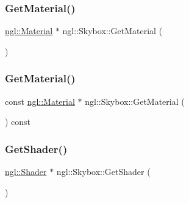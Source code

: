 \subsubsection{\texorpdfstring{Get\+Material()}{GetMaterial()}\hspace{0.1cm}{\footnotesize\ttfamily [1/2]}}
{\footnotesize\ttfamily \mbox{\hyperlink{classngl_1_1_material}{ngl\+::\+Material}} $\ast$ ngl\+::\+Skybox\+::\+Get\+Material (\begin{DoxyParamCaption}{ }\end{DoxyParamCaption})}

\mbox{\label{classngl_1_1_skybox_a04e9b704258a1527e41c3adfcc0d9f1d}} 
\subsubsection{\texorpdfstring{Get\+Material()}{GetMaterial()}\hspace{0.1cm}{\footnotesize\ttfamily [2/2]}}
{\footnotesize\ttfamily const \mbox{\hyperlink{classngl_1_1_material}{ngl\+::\+Material}} $\ast$ ngl\+::\+Skybox\+::\+Get\+Material (\begin{DoxyParamCaption}{ }\end{DoxyParamCaption}) const}

\mbox{\label{classngl_1_1_skybox_a3527ff0726586b9eec122f696ebd7c90}} 
\subsubsection{\texorpdfstring{Get\+Shader()}{GetShader()}\hspace{0.1cm}{\footnotesize\ttfamily [1/2]}}
{\footnotesize\ttfamily \mbox{\hyperlink{classngl_1_1_shader}{ngl\+::\+Shader}} $\ast$ ngl\+::\+Skybox\+::\+Get\+Shader (\begin{DoxyParamCaption}{ }\end{DoxyParamCaption})}

\mbox{\label{classngl_1_1_skybox_a796c826a599b8dc3304aed8ecd80e850}} 
